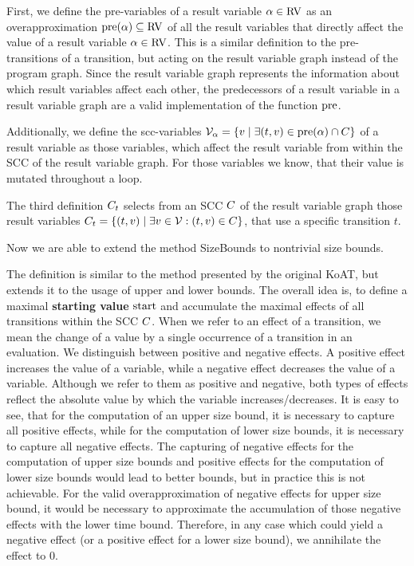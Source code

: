 
First, we define the pre-variables of a result variable $\alpha \in \text{RV}$ as an overapproximation $\text{pre}(\alpha) \subseteq \text{RV}$ of all the result variables that directly affect the value of a result variable $\alpha \in \text{RV}$.
This is a similar definition to the pre-transitions of a transition, but acting on the result variable graph instead of the program graph.
Since the result variable graph represents the information about which result variables affect each other, the predecessors of a result variable in a result variable graph are a valid implementation of the function $\text{pre}$.

Additionally, we define the scc-variables $\mathcal{V}_\alpha = \lbrace  v \mid \exists (t, v) \in \text{pre}(\alpha) \cap C  \rbrace$ of a result variable as those variables, which affect the result variable from within the SCC of the result variable graph.
For those variables we know, that their value is mutated throughout a loop.

The third definition $C_t$ selects from an SCC $C$ of the result variable graph those result variables $C_t = \lbrace (t,v) \mid \exists v \in \mathcal{V} : (t,v) \in C \rbrace$, that use a specific transition $t$.


Now we are able to extend the method SizeBounds to nontrivial size bounds.



The definition is similar to the method presented by the original KoAT, but extends it to the usage of upper and lower bounds.
The overall idea is, to define a maximal \textbf{starting value} $\text{start}$ and accumulate the maximal effects of all transitions within the SCC $C$.
When we refer to an effect of a transition, we mean the change of a value by a single occurrence of a transition in an evaluation.
We distinguish between positive and negative effects.
A positive effect increases the value of a variable, while a negative effect decreases the value of a variable.
Although we refer to them as positive and negative, both types of effects reflect the absolute value by which the variable increases/decreases.
It is easy to see, that for the computation of an upper size bound, it is necessary to capture all positive effects, while for the computation of lower size bounds, it is necessary to capture all negative effects.
The capturing of negative effects for the computation of upper size bounds and positive effects for the computation of lower size bounds would lead to better bounds, but in practice this is not achievable.
For the valid overapproximation of negative effects for upper size bound, it would be necessary to approximate the accumulation of those negative effects with the lower time bound.
Therefore, in any case which could yield a negative effect (or a positive effect for a lower size bound), we annihilate the effect to $0$.

